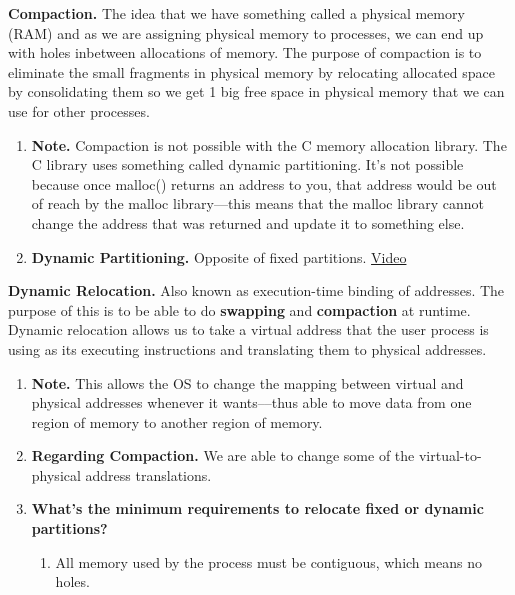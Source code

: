\documentclass[12pt]{article}
\begin{document}
{\bf Compaction.} {The idea that we have something called a physical memory (RAM) and as we are assigning physical memory to processes, we can end up with holes inbetween allocations of memory. The purpose of compaction is to eliminate the small fragments in physical memory by relocating allocated space by consolidating them so we get 1 big free space in physical memory that we can use for other processes.}
    \begin{enumerate}
        \item[]{\bf Note.} {Compaction is not possible with the C memory allocation library. The C library uses something called dynamic partitioning. It's not possible because once malloc() returns an address to you, that address would be out of reach by the malloc library––this means that the malloc library cannot change the address that was returned and update it to something else.}
        \item[] {\bf Dynamic Partitioning.} {Opposite of fixed partitions. \href{run:https://www.youtube.com/watch?v=bQVARMOIwFg}{Video} }
    \end{enumerate}
\vspace{1em}

{\bf Dynamic Relocation.} {Also known as execution-time binding of addresses. The purpose of this is to be able to do {\bf swapping} and {\bf compaction} at runtime. Dynamic relocation allows us to take a virtual address that the user process is using as its executing instructions and translating them to physical addresses.}
    \begin{enumerate}
        \item[]{\bf Note.} {This allows the OS to change the mapping between virtual and physical addresses whenever it wants––thus able to move data from one region of memory to another region of memory.}
        \item[] {\bf Regarding Compaction.} {We are able to change some of the virtual-to-physical address translations.}
        \item[] {\bf What's the minimum requirements to relocate fixed or dynamic partitions?} 
        \vspace{-0.5em}
        \begin{enumerate}
            \item[] All memory used by the process must be contiguous, which means no holes. 
        \end{enumerate}
    \end{enumerate}
\vspace{1em}
\end{document}
